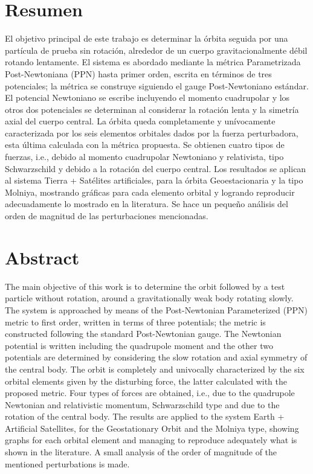 
\chapter*{Resumen}
El objetivo principal de este trabajo es determinar la órbita seguida por una partícula de prueba sin rotación, alrededor de un cuerpo gravitacionalmente débil rotando lentamente. El sistema es abordado mediante la métrica Parametrizada Post-Newtoniana (PPN) hasta primer orden, escrita en términos de tres potenciales; la métrica se construye siguiendo el gauge Post-Newtoniano estándar. El potencial Newtoniano se escribe incluyendo el momento cuadrupolar y los otros dos potenciales se determinan al considerar la rotación lenta y la simetría axial del cuerpo central. La órbita queda completamente y unívocamente caracterizada por los seis elementos orbitales dados por la fuerza perturbadora, esta última calculada con la métrica propuesta. Se obtienen cuatro tipos de fuerzas, i.e., debido al momento cuadrupolar Newtoniano y relativista, tipo Schwarzschild y debido a la rotación del cuerpo central. Los resultados se aplican al sistema Tierra + Satélites artificiales, para la órbita Geoestacionaria y la tipo Molniya, mostrando gráficas para cada elemento orbital y logrando reproducir adecuadamente lo mostrado en la literatura. Se hace un pequeño análisis del orden de magnitud de las perturbaciones mencionadas.

\chapter*{Abstract}
The main objective of this work is to determine the orbit followed by a test particle without rotation, around a gravitationally weak body rotating slowly. The system is approached by means of the Post-Newtonian Parameterized (PPN) metric to first order, written in terms of three potentials; the metric is constructed following the standard Post-Newtonian gauge. The Newtonian potential is written including the quadrupole moment and the other two potentials are determined by considering the slow rotation and axial symmetry of the central body. The orbit is completely and univocally characterized by the six orbital elements given by the disturbing force, the latter calculated with the proposed metric. Four types of forces are obtained, i.e., due to the quadrupole Newtonian and relativistic momentum, Schwarzschild type and due to the rotation of the central body. The results are applied to the system Earth + Artificial Satellites, for the Geostationary Orbit and the Molniya type, showing graphs for each orbital element and managing to reproduce adequately what is shown in the literature. A small analysis of the order of magnitude of the mentioned perturbations is made.


